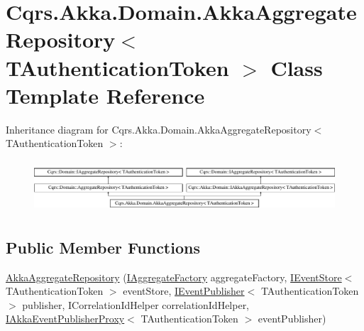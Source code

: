 \hypertarget{classCqrs_1_1Akka_1_1Domain_1_1AkkaAggregateRepository}{}\section{Cqrs.\+Akka.\+Domain.\+Akka\+Aggregate\+Repository$<$ T\+Authentication\+Token $>$ Class Template Reference}
\label{classCqrs_1_1Akka_1_1Domain_1_1AkkaAggregateRepository}
Inheritance diagram for Cqrs.\+Akka.\+Domain.\+Akka\+Aggregate\+Repository$<$ T\+Authentication\+Token $>$\+:\begin{figure}[H]
\begin{center}
\leavevmode
\includegraphics[height=1.958042cm]{classCqrs_1_1Akka_1_1Domain_1_1AkkaAggregateRepository}
\end{center}
\end{figure}
\subsection*{Public Member Functions}
\begin{DoxyCompactItemize}
\item 
\hyperlink{classCqrs_1_1Akka_1_1Domain_1_1AkkaAggregateRepository_afc997ba5187ca08d3f81a0c204eda3a2_afc997ba5187ca08d3f81a0c204eda3a2}{Akka\+Aggregate\+Repository} (\hyperlink{interfaceCqrs_1_1Domain_1_1Factories_1_1IAggregateFactory}{I\+Aggregate\+Factory} aggregate\+Factory, \hyperlink{interfaceCqrs_1_1Events_1_1IEventStore}{I\+Event\+Store}$<$ T\+Authentication\+Token $>$ event\+Store, \hyperlink{interfaceCqrs_1_1Events_1_1IEventPublisher}{I\+Event\+Publisher}$<$ T\+Authentication\+Token $>$ publisher, I\+Correlation\+Id\+Helper correlation\+Id\+Helper, \hyperlink{interfaceCqrs_1_1Akka_1_1Events_1_1IAkkaEventPublisherProxy}{I\+Akka\+Event\+Publisher\+Proxy}$<$ T\+Authentication\+Token $>$ event\+Publisher)
\end{DoxyCompactItemize}
